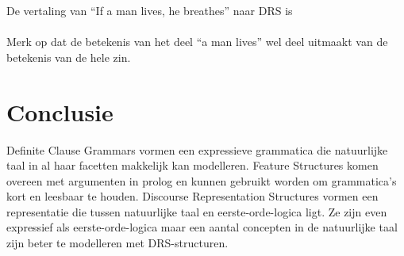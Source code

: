De vertaling van ``If a man lives, he breathes'' naar DRS is \\


\paragraph{} Merk op dat de betekenis van het deel ``a man lives''  wel deel uitmaakt van de betekenis van de hele zin.

\section{Conclusie} Definite Clause Grammars vormen een expressieve grammatica die natuurlijke taal in al haar facetten makkelijk kan modelleren. Feature Structures komen overeen met argumenten in prolog en kunnen gebruikt worden om grammatica's kort en leesbaar te houden. Discourse Representation Structures vormen een representatie die tussen natuurlijke taal en eerste-orde-logica ligt. Ze zijn even expressief als eerste-orde-logica maar een aantal concepten in de natuurlijke taal zijn beter te modelleren met DRS-structuren.
